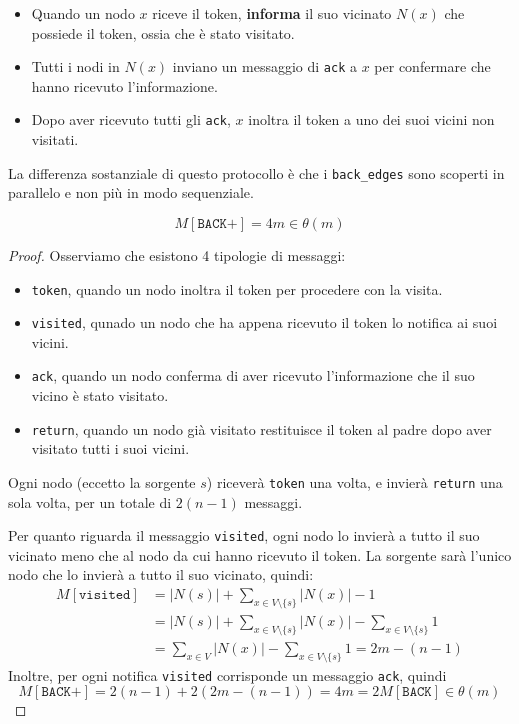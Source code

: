 \begin{itemize}
    \item Quando un nodo $x$ riceve il token, \textbf{informa} il suo vicinato $N(x)$ che possiede il token, ossia che è stato visitato.
    \item Tutti i nodi in $N(x)$ inviano un messaggio di \texttt{ack} a $x$ per confermare che hanno ricevuto l'informazione.
    \item Dopo aver ricevuto tutti gli \texttt{ack}, $x$ inoltra il token a uno dei suoi vicini non visitati.
\end{itemize}

La differenza sostanziale di questo protocollo è che i \texttt{back\_edges} sono scoperti in parallelo e non più in modo sequenziale.

\begin{teorema}
    \[
        M[\texttt{BACK+}] = 4m \in \theta(m)
    \]
    \begin{proof}
        Osserviamo che esistono 4 tipologie di messaggi: 
        \begin{itemize}
            \item \texttt{token}, quando un nodo inoltra il token per procedere con la visita.
            \item \texttt{visited}, qunado un nodo che ha appena ricevuto il token lo notifica ai suoi vicini.
            \item \texttt{ack}, quando un nodo conferma di aver ricevuto l'informazione che il suo vicino è stato visitato.
            \item \texttt{return}, quando un nodo già visitato restituisce il token al padre dopo aver visitato tutti i suoi vicini.
        \end{itemize}
        Ogni nodo (eccetto la sorgente $s$) riceverà \texttt{token} una volta, e invierà \texttt{return} una sola volta, per un totale di $2(n-1)$ messaggi.

        Per quanto riguarda il messaggio \texttt{visited}, ogni nodo lo invierà a tutto il suo vicinato meno che al nodo da cui hanno ricevuto il token. La sorgente sarà l'unico nodo che lo invierà a tutto il suo vicinato, quindi:
        \begin{align*}
            M[\texttt{visited}] &= |N(s)| + \sum_{x \in V \setminus \{s\}} |N(x)| - 1 \\
            &= |N(s)| + \sum_{x \in V \setminus \{s\}} |N(x)| - \sum_{x \in V \setminus \{s\}} 1 \\
            &= \sum_{x \in V} |N(x)| - \sum_{x \in V \setminus \{s\}} 1 = 2m - (n-1)
        \end{align*}
        Inoltre, per ogni notifica \texttt{visited} corrisponde un messaggio \texttt{ack}, quindi 
        \[
            M[\texttt{BACK+}] = 2(n-1) + 2(2m - (n-1)) = 4m = 2M[\texttt{BACK}] \in \theta(m)
        \]
    \end{proof}
\end{teorema}

